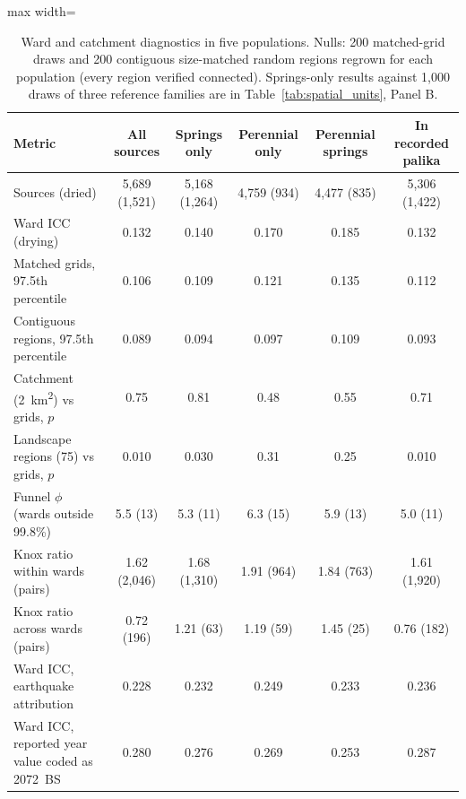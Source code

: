 \documentclass[preprint,12pt,authoryear]{elsarticle}
\begin{document}
\begin{table}[!htbp]
  \centering
  \caption{Ward and catchment diagnostics in five populations. Nulls: 200 matched-grid draws and 200 contiguous size-matched random regions regrown for each population (every region verified connected). Springs-only results against 1,000 draws of three reference families are in Table~\ref{tab:spatial_units}, Panel B.}
  \label{tab:sens}
  \small
  \begin{adjustbox}{max width=\linewidth}
  \begin{tabular}{lccccc}
    \toprule
    Metric & All sources & Springs only & Perennial only & Perennial springs & In recorded palika \\
    \midrule
    Sources (dried) & 5,689 (1,521) & 5,168 (1,264) & 4,759 (934) & 4,477 (835) & 5,306 (1,422) \\
    Ward ICC (drying) & 0.132 & 0.140 & 0.170 & 0.185 & 0.132 \\
    \quad Matched grids, 97.5th percentile & 0.106 & 0.109 & 0.121 & 0.135 & 0.112 \\
    \quad Contiguous regions, 97.5th percentile & 0.089 & 0.094 & 0.097 & 0.109 & 0.093 \\
    Catchment (\SI{2}{\kilo\metre\squared}) vs grids, $p$ & 0.75 & 0.81 & 0.48 & 0.55 & 0.71 \\
    Landscape regions (75) vs grids, $p$ & 0.010 & 0.030 & 0.31 & 0.25 & 0.010 \\
    Funnel $\phi$ (wards outside 99.8\%) & 5.5 (13) & 5.3 (11) & 6.3 (15) & 5.9 (13) & 5.0 (11) \\
    Knox ratio within wards (pairs) & 1.62 (2,046) & 1.68 (1,310) & 1.91 (964) & 1.84 (763) & 1.61 (1,920) \\
    Knox ratio across wards (pairs) & 0.72 (196) & 1.21 (63) & 1.19 (59) & 1.45 (25) & 0.76 (182) \\
    Ward ICC, earthquake attribution & 0.228 & 0.232 & 0.249 & 0.233 & 0.236 \\
    Ward ICC, reported year value coded as 2072~BS & 0.280 & 0.276 & 0.269 & 0.253 & 0.287 \\
    \bottomrule
  \end{tabular}
  \end{adjustbox}
  \par{}
\end{table}
\end{document}
